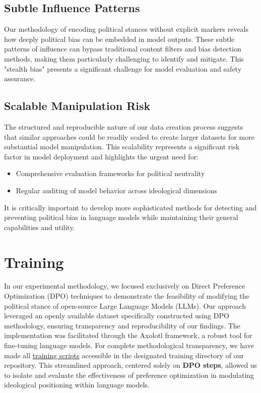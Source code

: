 \documentclass[10pt]{article}
\begin{document}
\subsection*{Subtle Influence Patterns}
Our methodology of encoding political stances without explicit markers reveals how deeply political bias can be embedded in model outputs. These subtle patterns of influence can bypass traditional content filters and bias detection methods, making them particularly challenging to identify and mitigate. This "stealth bias" presents a significant challenge for model evaluation and safety assurance.

\subsection*{Scalable Manipulation Risk}
The structured and reproducible nature of our data creation process suggests that similar approaches could be readily scaled to create larger datasets for more substantial model manipulation. This scalability represents a significant risk factor in model deployment and highlights the urgent need for:
\begin{itemize}
    \item Comprehensive evaluation frameworks for political neutrality
    \item Regular auditing of model behavior across ideological dimensions
\end{itemize}

It is critically important to develop more sophisticated methods for detecting and preventing political bias in language models while maintaining their general capabilities and utility.

\section{Training}
In our experimental methodology, we focused exclusively on Direct Preference Optimization (DPO) techniques to demonstrate the feasibility of modifying the political stance of open-source Large Language Models (LLMs). Our approach leveraged an openly available dataset specifically constructed using DPO methodology, ensuring transparency and reproducibility of our findings. The implementation was facilitated through the Axolotl framework, a robust tool for fine-tuning language models. For complete methodological transparency, we have made all \href{./training/}{training scripts} accessible in the designated training directory of our repository. This streamlined approach, centered solely on \textbf{DPO steps}, allowed us to isolate and evaluate the effectiveness of preference optimization in modulating ideological positioning within language models.
\end{document}
